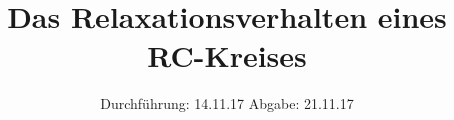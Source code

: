 

\subject{V101}
\title{Das Relaxationsverhalten eines RC-Kreises}
\date{
  Durchführung: 14.11.17
  \hspace{3em}
  Abgabe: 21.11.17
}



\maketitle
\thispagestyle{empty}
\tableofcontents
\newpage








\newpage
\printbibliography


